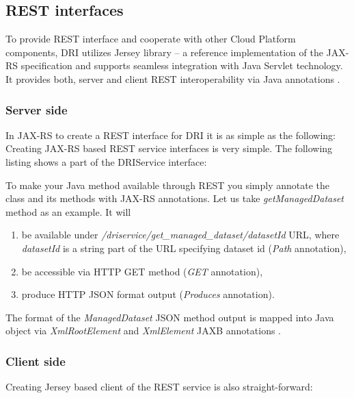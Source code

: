\subsection{REST interfaces}
To provide REST interface and cooperate with other Cloud Platform
components, DRI utilizes Jersey library \cite{jersey} -- a reference
implementation of the JAX-RS specification \cite{jax-rs} and supports seamless
integration with Java Servlet technology. It provides both, server and client
REST interoperability via Java annotations \cite{jls}.\\

\subsubsection{Server side}
In JAX-RS to create a REST interface for DRI it is as simple as the following:
Creating JAX-RS based REST service interfaces is very simple. The following
listing shows a part of the DRIService interface:



To make your Java method available through REST you simply annotate the class and its methods with
JAX-RS annotations. Let us take \textit{getManagedDataset} method as an example. It will

\begin{enumerate}
\item be available under \textit{/driservice/get\_managed\_dataset/{datasetId}} URL,
where \textit{datasetId} is a string part of the URL specifying dataset id (\textit{Path} annotation),
\item be accessible via HTTP GET method (\textit{GET} annotation),
\item produce HTTP JSON format output (\textit{Produces} annotation).
\end{enumerate}

The format of the \textit{ManagedDataset} JSON method output is mapped into Java object
via \textit{XmlRootElement} and \textit{XmlElement} JAXB annotations \cite{jaxb}.
 
\subsubsection{Client side}
Creating Jersey based client of the REST service is also straight-forward:



